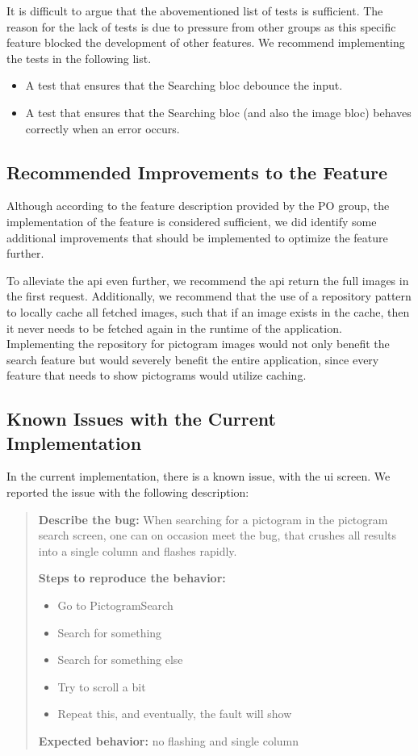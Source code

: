 It is difficult to argue that the abovementioned list of tests is sufficient. The reason for the lack of tests is due to pressure from other groups as this specific feature blocked the development of other features. We recommend implementing the tests in the following list.

\begin{itemize}
  \item A test that ensures that the Searching \gls{bloc} debounce the input.
  \item A test that ensures that the Searching \gls{bloc} (and also the image \gls{bloc}) behaves correctly when an error occurs.
\end{itemize}

\subsection{Recommended Improvements to the Feature}
Although according to the feature description provided by the \gls{PO} group, the implementation of the feature is considered sufficient, we did identify some additional improvements that should be implemented to optimize the feature further.

To alleviate the \gls{api} even further, we recommend the \gls{api} return the full images in the first request. Additionally, we recommend that the use of a repository pattern to locally cache all fetched images, such that if an image exists in the cache, then it never needs to be fetched again in the runtime of the application. Implementing the repository for pictogram images would not only benefit the search feature but would severely benefit the entire application, since every feature that needs to show pictograms would utilize caching.

\subsection{Known Issues with the Current Implementation}

In the current implementation, there is a known issue, with the \gls{ui} screen. We reported the issue with the following description:

\begin{quote}
\textbf{Describe the bug:} When searching for a pictogram in the pictogram search screen, one can on occasion meet the bug, that crushes all results into a single column and flashes rapidly.

\textbf{Steps to reproduce the behavior:}
\begin{itemize}
  \item Go to PictogramSearch
  \item Search for something
  \item Search for something else
  \item Try to scroll a bit
  \item Repeat this, and eventually, the fault will show
\end{itemize}

\textbf{Expected behavior:} no flashing and single column
\end{quote}
